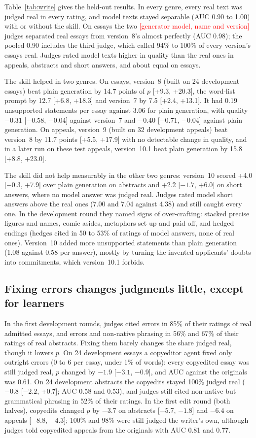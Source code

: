 \documentclass[11pt]{article}
\newcommand{\TBD}[1]{\textcolor{red}{[#1]}}
\newcommand{\genmodel}{\TBD{generator model, name and version}}
\begin{document}
Table~\ref{tab:write} gives the held-out results. In every genre, every real text was judged real in every rating, and model texts stayed separable (AUC 0.90 to 1.00) with or without the skill. On essays the two \genmodel{} judges separated real essays from version~8's almost perfectly (AUC 0.98); the pooled 0.90 includes the third judge, which called 94\% to 100\% of every version's essays real. Judges rated model texts higher in quality than the real ones in appeals, abstracts and short answers, and about equal on essays.

The skill helped in two genres. On essays, version~8 (built on 24 development essays) beat plain generation by 14.7 points of $p$ [+9.3, +20.3], the word-list prompt by 12.7 [+6.8, +18.3] and version~7 by 7.5 [+2.4, +13.1]. It had 0.19 unsupported statements per essay against 3.06 for plain generation, with quality $-0.31$ [$-0.58$, $-0.04$] against version~7 and $-0.40$ [$-0.71$, $-0.04$] against plain generation. On appeals, version~9 (built on 32 development appeals) beat version~8 by 11.7 points [+5.5, +17.9] with no detectable change in quality, and in a later run on these test appeals, version~10.1 beat plain generation by 15.8 [+8.8, +23.0].

The skill did not help measurably in the other two genres: version~10 scored +4.0 [$-0.3$, +7.9] over plain generation on abstracts and +2.2 [$-1.7$, +6.0] on short answers, where no model answer was judged real. Judges rated model short answers above the real ones (7.00 and 7.04 against 4.38) and still caught every one. In the development round they named signs of over-crafting: stacked precise figures and names, comic asides, metaphors set up and paid off, and hedged endings (hedges cited in 50 to 53\% of ratings of model answers, none of real ones). Version~10 added more unsupported statements than plain generation (1.08 against 0.58 per answer), mostly by turning the invented applicants' doubts into commitments, which version~10.1 forbids.

\subsection{Fixing errors changes judgments little, except for learners}
\label{sec:errors}

In the first development rounds, judges cited errors in 85\% of their ratings of real admitted essays, and errors and non-native phrasing in 56\% and 67\% of their ratings of real abstracts. Fixing them barely changes the share judged real, though it lowers $p$. On 24 development essays a copyeditor agent fixed only outright errors (0 to 6 per essay, under 1\% of words): every copyedited essay was still judged real, $p$ changed by $-1.9$ [$-3.1$, $-0.9$], and AUC against the originals was 0.61. On 24 development abstracts the copyedits stayed 100\% judged real ($-0.8$ [$-2.2$, +0.7]; AUC 0.58 and 0.53), and judges still cited non-native but grammatical phrasing in 52\% of their ratings. In the first edit round (both halves), copyedits changed $p$ by $-3.7$ on abstracts [$-5.7$, $-1.8$] and $-6.4$ on appeals [$-8.8$, $-4.3$]; 100\% and 98\% were still judged the writer's own, although judges told copyedited appeals from the originals with AUC 0.81 and 0.77.
\end{document}
